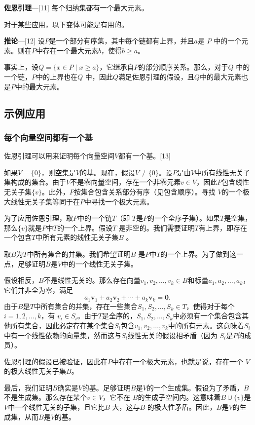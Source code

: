 \textbf{佐恩引理}—[11] 每个归纳集都有一个最大元素。

对于某些应用，以下变体可能是有用的。

\textbf{推论}—[12] 设\( P \)是一个部分有序集，其中每个链都有上界，并且\( a \)是 \( P \) 中的一个元素。则在\( P \)中存在一个最大元素\( b \)，使得\( b \geq a \)。

事实上，设\( Q = \{x \in P \mid x \geq a\} \)，它继承自\( P \)的部分顺序关系。那么，对于\( Q \) 中的一个链，\( P \)中的上界也在\( Q \) 中，因此\( Q \)满足佐恩引理的假设，且\( Q \)中的最大元素也是\( P \)中的最大元素。
\subsection{示例应用}  
\subsubsection{每个向量空间都有一个基} 
佐恩引理可以用来证明每个向量空间\( V \)都有一个基。[13]

如果\( V = \{0\} \)，则空集是\( V \)的基。现在，假设\( V \neq \{0\} \)。设\( P \)是由\( V \)中所有线性无关子集构成的集合。由于\( V \)不是零向量空间，存在一个非零元素\( v \in V \)，因此\( P \)包含线性无关子集\( \{v\} \)。此外，\( P \)按集合包含关系部分有序（见包含顺序）。寻找 \( V \)的一个极大线性无关子集等同于在\( P \)中寻找一个极大元素。

为了应用佐恩引理，取\( P \)中的一个链\( T \)（即 \( T \)是\( P \)的一个全序子集）。如果\( T \)是空集，那么\( \{v\} \)就是\( P \)中\( T \)的一个上界。假设\( T \) 是非空的。我们需要证明\( T \)有上界，即存在一个包含\( T \)中所有元素的线性无关子集\( B \) 。

取\( B \)为\( T \)中所有集合的并集。我们希望证明\( B \) 是\( P \)中\( T \)的一个上界。为了做到这一点，足够证明\( B \)是\( V \)中的一个线性无关子集。

假设相反，\( B \)不是线性无关的。那么存在向量\( v_1, v_2, \dots, v_k \in B \)和标量\( a_1, a_2, \dots, a_k \)，它们并非全为零，满足
\[
a_1 \mathbf{v}_1 + a_2 \mathbf{v}_2 + \cdots + a_k \mathbf{v}_k = \mathbf{0}.~
\]
由于\( B \)是\( T \)中所有集合的并集，存在一些集合\( S_1, S_2, \dots, S_k \in T \)，使得对于每个\( i = 1, 2, \dots, k \)，有 \( v_i \in S_i \)。由于\( T \)是全序的，\( S_1, S_2, \dots, S_k \)中必须有一个集合包含其他所有集合，因此必定存在某个集合\( S_i \)包含\( v_1, v_2, \dots, v_k \)中的所有元素。这意味着\( S_i \)中有一个线性依赖的向量集，然而这与\( S_i \)线性无关的假设相矛盾（因为 \( S_i \)是\( P \)的成员）。

佐恩引理的假设已被验证，因此在\( P \)中存在一个极大元素，也就是说，存在一个 \( V \)的极大线性无关子集\( B \)。

最后，我们证明\( B \)确实是\( V \)的基。足够证明\( B \)是\( V \)的一个生成集。假设为了矛盾，\( B \)不是生成集。那么存在某个\( v \in V \)，它不在 \( B \)的生成子空间内。这意味着\( B \cup \{v\} \)是 \( V \)中一个线性无关的子集，且它比\( B \) 大，这与\( B \) 的极大性矛盾。因此，\( B \)是\( V \)的生成集，从而\( B \)是\( V \)的基。